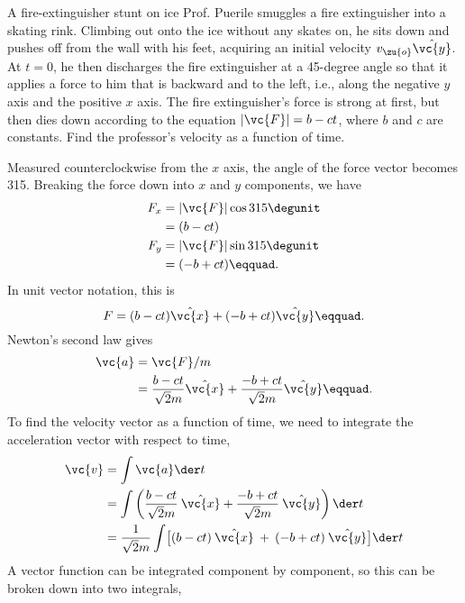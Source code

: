 \begin{eg}{A fire-extinguisher stunt on ice}
\egquestion Prof. Puerile smuggles a fire extinguisher into a
skating rink. Climbing out onto the ice without any skates
on, he sits down and pushes off from the wall with his feet,
acquiring an initial velocity $v_\zu{o}\hat{\vc{y}}$. At $t=0$, he then
discharges the fire extinguisher at a 45-degree angle so
that it applies a force to him that is backward and to the
left, i.e., along the negative $y$ axis and the positive $x$
axis. The fire extinguisher's force is strong at first, but
then dies down according to the equation $|\vc{F}|=b-ct$,
where $b$ and $c$ are constants. Find the professor's
velocity as a function of time.

\eganswer Measured counterclockwise from the $x$ axis, the
angle of the force vector becomes 315\degunit. Breaking the
force down into $x$ and $y$ components, we have
\begin{align*}
        F_x     &=    |\vc{F}| \cos  315\degunit  \\
             &=     (b-ct)  \\
        F_y     &=    |\vc{F}| \sin  315\degunit  \\
             &=     (-b+ct)\eqquad.
\end{align*}
In unit vector notation, this is
\begin{equation*}
        F     =     (b-ct)\hat{\vc{x}} +  (-b+ct)\hat{\vc{y}}\eqquad.
\end{equation*}
Newton's second law gives
\begin{align*}
        \vc{a}     &=    \vc{F}/m \\
                   &=    \frac{b-ct}{\sqrt{2}m}\hat{\vc{x}} + \frac{-b+ct}{\sqrt{2}m}\hat{\vc{y}}\eqquad.
\end{align*}
To find the velocity vector as a function of time, we need
to integrate the acceleration vector with respect to time,
\begin{align*}
        \vc{v}     &=  \int \vc{a} \der t    \\
                   &=  \int \left(  \frac{b-ct}{\sqrt{2}m} \: \hat{\vc{x}} + \frac{-b+ct}{\sqrt{2}m} \: \hat{\vc{y}} \right) \der t    \\
                   &=  \frac{1}{\sqrt{2}m} \int \bigl[ (b-ct) \: \hat{\vc{x}} \: + \: (-b+ct) \: \hat{\vc{y}} \bigr] \der t    \\
\end{align*}
A vector function can be integrated component by component,
so this can be broken down into two integrals,


\end{eg}
